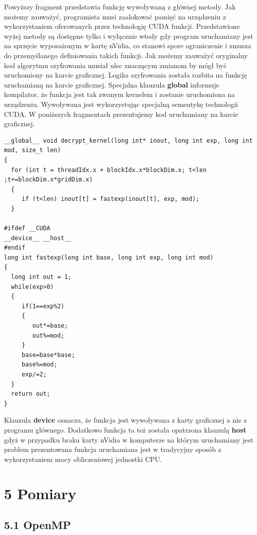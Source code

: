 \documentclass[a4paper,12pt]{article}
\begin{document}
Powyższy fragment przedstawia funkcję wywoływaną z głównej metody. Jak możemy zauważyć, programista musi zaalokować pamięć na urządzeniu z wykorzystaniem oferowanych przez technologię CUDA funkcji. Przedstawione wyżej metody są dostępne tylko i wyłącznie wtedy gdy program uruchamiany jest na sprzęcie wyposażonym w kartę nVidia, co stanowi spore ograniczenie i zmusza do przemyślanego definiowania takich funkcji. Jak możemy zauważyć oryginalny kod algorytmu szyfrowania musiał ulec znaczącym zmianom by mógł być uruchomiony na karcie graficznej. 
Logika szyfrowania została  rozbita na funkcję uruchamianą na karcie graficznej. Specjalna klauzula \textbf{global} informuje kompilator, że funkcja jest tak zwanym kernelem i zostanie uruchomiona na urządzeniu. Wywoływana jest wykorzystując specjalną sementykę technologii CUDA. W poniższych fragmentach prezentujemy kod uruchamiany na karcie graficznej.


\begin{lstlisting}
__global__ void decrypt_kernel(long int* inout, long int exp, long int mod, size_t len)
{
  for (int t = threadIdx.x + blockIdx.x*blockDim.x; t<len ;t+=blockDim.x*gridDim.x)
  {
     if (t<len) inout[t] = fastexp(inout[t], exp, mod);
  }

#ifdef __CUDA
__device__ __host__
#endif
long int fastexp(long int base, long int exp, long int mod)
{
  long int out = 1;
  while(exp>0)
  {
     if(1==exp%2)
     {
        out*=base;
        out%=mod;
     } 
     base=base*base;
     base%=mod;
     exp/=2;
  }
  return out;
}

\end{lstlisting}

Klauzula \textbf{device} oznacza, że funkcja jest wywoływana z karty graficznej a nie z programu głównego. Dodatkowo funkcja ta też została opatrzona klauzulą \textbf{host} gdyż w przypadku braku karty nVidia w komputerze na którym uruchamiany jest problem prezentowana funkcja uruchamiana jest w tradycyjny sposób z wykorzystaniem mocy obliczeniowej jednostki CPU.

\newpage


\section*{5 Pomiary}

\subsection*{5.1 OpenMP}
\end{document}
